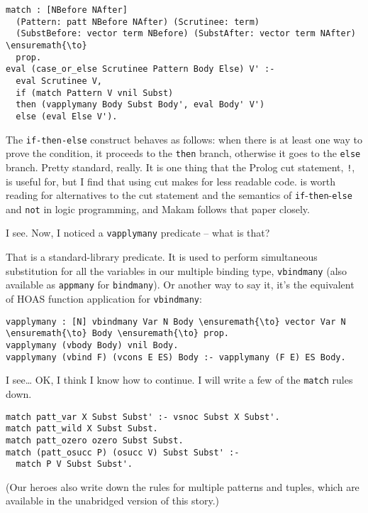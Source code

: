\begin{verbatim}
match : [NBefore NAfter]
  (Pattern: patt NBefore NAfter) (Scrutinee: term)
  (SubstBefore: vector term NBefore) (SubstAfter: vector term NAfter) \ensuremath{\to}
  prop.
eval (case_or_else Scrutinee Pattern Body Else) V' :-
  eval Scrutinee V,
  if (match Pattern V vnil Subst)
  then (vapplymany Body Subst Body', eval Body' V')
  else (eval Else V').
\end{verbatim}

\noindent
The \texttt{if-then-else} construct behaves as follows: when there is at
least one way to prove the condition, it proceeds to the \texttt{then}
branch, otherwise it goes to the \texttt{else} branch. Pretty standard,
really. It is one thing that the Prolog cut statement, \texttt{!}, is
useful for, but I find that using cut makes for less readable code.
\citet{kiselyov05backtracking} is worth reading for alternatives to the
cut statement and the semantics of
\texttt{if}-\texttt{then}-\texttt{else} and \texttt{not} in logic
programming, and Makam follows that paper closely.

\heroSTUDENT{} I see. Now, I noticed a \texttt{vapplymany} predicate -- what
is that?

\heroADVISOR{} That is a standard-library predicate. It is used to perform
simultaneous substitution for all the variables in our multiple binding
type, \texttt{vbindmany} (also available as \texttt{appmany} for
\texttt{bindmany}). Or another way to say it, it's the equivalent of
HOAS function application for \texttt{vbindmany}:

\begin{verbatim}
vapplymany : [N] vbindmany Var N Body \ensuremath{\to} vector Var N \ensuremath{\to} Body \ensuremath{\to} prop.
vapplymany (vbody Body) vnil Body.
vapplymany (vbind F) (vcons E ES) Body :- vapplymany (F E) ES Body.
\end{verbatim}

\heroSTUDENT{} I see\ldots{} OK, I think I know how to continue. I will write
a few of the \texttt{match} rules down.

\begin{verbatim}
match patt_var X Subst Subst' :- vsnoc Subst X Subst'.
match patt_wild X Subst Subst.
match patt_ozero ozero Subst Subst.
match (patt_osucc P) (osucc V) Subst Subst' :-
  match P V Subst Subst'.
\end{verbatim}

\begin{scenecomment}
(Our heroes also write down the rules for multiple patterns and tuples, which are
available in the unabridged version of this story.)
\end{scenecomment}

